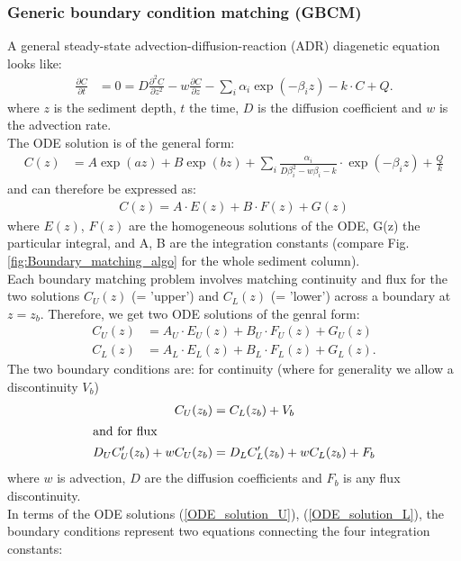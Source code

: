 \documentclass[gmd, manuscript]{copernicus}
\begin{document}
\subsubsection{Generic boundary condition matching (GBCM)}\label{subsec:GBCM}
A general steady-state advection-diffusion-reaction (ADR) diagenetic equation looks like:
\begin{align} 
 \frac{\partial C}{\partial t} &= 0 = D\frac{\partial^2C }{\partial z^2} - w\frac{\partial C }{\partial z} - \sum_i \alpha_i \exp(-\beta_i z) - k\cdot C + Q.
\end{align}
where $z$ is the sediment depth, $t$ the time, $D$ is the diffusion coefficient and $w$ is the advection rate.\\
The ODE solution is of the general form:
\begin{align}
 C(z) &= A \exp(az) + B  \exp(bz) + \sum_i \frac{\alpha_i}{D \beta_i^2-w\beta_i-k}\cdot \exp(-\beta_i z) + \frac{Q}{k}
\end{align}
and can therefore be expressed as:
\begin{align}
C(z) = A \cdot E(z) + B \cdot F(z) + G(z) 
\end{align}
where $E(z)$, $F (z)$ are the homogeneous solutions of the ODE, G(z) the particular integral, and A, B are the integration constants (compare Fig. \ref{fig:Boundary_matching_algo} for the whole sediment column).\\[1em]
Each boundary matching problem involves matching continuity and flux for the two solutions $C_U(z)$ (= 'upper') and $C_L(z)$ (= 'lower') across a boundary at $z = z_b$. Therefore, we get two ODE solutions of the genral form:
\begin{align}
C_U(z) &= A_U \cdot E_U(z) + B_U \cdot F_U(z) + G_U(z) \label{ODE_solution_U}\\
C_L(z) &= A_L \cdot E_L(z) + B_L \cdot F_L(z) + G_L(z) .\label{ODE_solution_L}
\end{align}
The two boundary conditions are: for continuity (where for generality we allow a discontinuity $V_b$) 
\begin{align}
  C_U(z_b) &= C_L(z_b) + V_b	\\
\intertext{and for flux}
 D_U C_U'(z_b) + wC_U(z_b) &=  D_LC_L'(z_b) + wC_L(z_b) + F_b
\end{align}
where $w$ is advection, $D$ are the diffusion coefficients and $F_b$ is any flux discontinuity.\\[1em]
In terms of the ODE solutions (\ref{ODE_solution_U}), (\ref{ODE_solution_L}), the boundary conditions represent two equations connecting the four integration constants:\\
\end{document}

